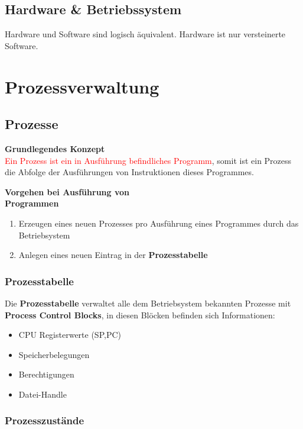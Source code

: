 \documentclass[10pt,a4paper]{article}
\begin{document}
\begin{multicols*}{4}
\subsection{Hardware \& Betriebssystem}\label{subsec:hardware-betriebssystem}
Hardware und Software sind logisch äquivalent.
Hardware ist nur versteinerte Software.

\section{Prozessverwaltung}\label{sec:prozessverwaltung}

\subsection{Prozesse}

\textbf{Grundlegendes Konzept}\hfill\\
\textcolor{red}{Ein Prozess ist ein in Ausführung befindliches Programm}, somit ist
ein Prozess die Abfolge der Ausführungen von Instruktionen dieses Programmes.

\textbf{Vorgehen bei Ausführung von\\Programmen}\hfill
\begin{enumerate}
	\item Erzeugen eines neuen Prozesses pro Ausführung eines Programmes durch das Betriebsystem
	\item Anlegen eines neuen Eintrag in der \textbf{Prozesstabelle}
\end{enumerate}

\subsubsection{Prozesstabelle}\label{subsubsec:prozesstabelle}

Die \textbf{Prozesstabelle} verwaltet alle dem Betriebsystem bekannten Prozesse mit \textbf{Process Control Blocks},
in diesen Blöcken befinden sich Informationen:
\begin{itemize}
	\item CPU Registerwerte (SP,PC)
	\item Speicherbelegungen
	\item Berechtigungen
	\item Datei-Handle
\end{itemize}

\subsubsection{Prozesszustände}\label{subsubsec:prozesszustände}


\end{multicols*}
\end{document}
